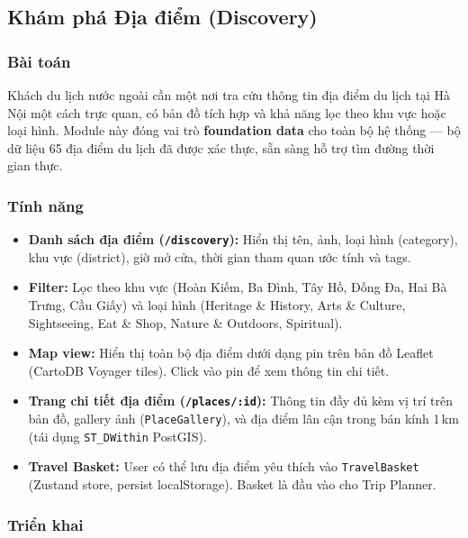 \documentclass[12pt,a4paper]{article}
\begin{document}
\subsection{Khám phá Địa điểm (Discovery)}

\subsubsection{Bài toán}

Khách du lịch nước ngoài cần một nơi tra cứu thông tin địa điểm du lịch tại
Hà Nội một cách trực quan, có bản đồ tích hợp và khả năng lọc theo khu vực
hoặc loại hình. Module này đóng vai trò \textbf{foundation data} cho toàn bộ
hệ thống --- bộ dữ liệu 65 địa điểm du lịch đã được xác thực, sẵn sàng hỗ trợ
tìm đường thời gian thực.

\subsubsection{Tính năng}

\begin{itemize}
  \item \textbf{Danh sách địa điểm (\texttt{/discovery}):} Hiển thị tên, ảnh,
        loại hình (category), khu vực (district), giờ mở cửa, thời gian tham
        quan ước tính và tags.
  \item \textbf{Filter:} Lọc theo khu vực (Hoàn Kiếm, Ba Đình, Tây Hồ, Đống
        Đa, Hai Bà Trưng, Cầu Giấy) và loại hình (Heritage \& History,
        Arts \& Culture, Sightseeing, Eat \& Shop, Nature \& Outdoors,
        Spiritual).
  \item \textbf{Map view:} Hiển thị toàn bộ địa điểm dưới dạng pin trên bản
        đồ Leaflet (CartoDB Voyager tiles). Click vào pin để xem thông tin
        chi tiết.
  \item \textbf{Trang chi tiết địa điểm (\texttt{/places/:id}):} Thông tin
        đầy đủ kèm vị trí trên bản đồ, gallery ảnh (\texttt{PlaceGallery}),
        và địa điểm lân cận trong bán kính 1\,km (tái dụng
        \texttt{ST\_DWithin} PostGIS).
  \item \textbf{Travel Basket:} User có thể lưu địa điểm yêu thích vào
        \texttt{TravelBasket} (Zustand store, persist localStorage). Basket
        là đầu vào cho Trip Planner.
\end{itemize}

\subsubsection{Triển khai}
\end{document}
